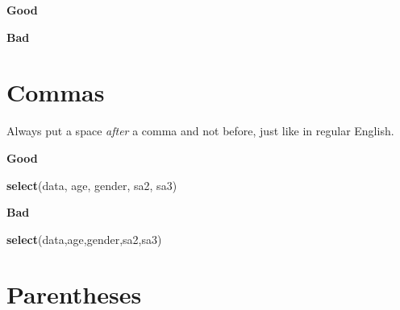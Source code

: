 \documentclass[]{book}
\newenvironment{Shaded}{\begin{snugshade}}{\end{snugshade}}
\newcommand{\DecValTok}[1]{\textcolor[rgb]{0.00,0.00,0.81}{#1}}
\newcommand{\KeywordTok}[1]{\textcolor[rgb]{0.13,0.29,0.53}{\textbf{#1}}}
\newcommand{\NormalTok}[1]{#1}
\newcommand{\OperatorTok}[1]{\textcolor[rgb]{0.81,0.36,0.00}{\textbf{#1}}}
\newcommand{\StringTok}[1]{\textcolor[rgb]{0.31,0.60,0.02}{#1}}
\begin{document}
\textbf{Good}

\begin{Shaded}
\end{Shaded}

\textbf{Bad}

\begin{Shaded}
\end{Shaded}

\hypertarget{commas}{%
\section{Commas}\label{commas}}

Always put a space \emph{after} a comma and not before, just like in regular English.

\textbf{Good}

\begin{Shaded}
\begin{Highlighting}[]
\KeywordTok{select}\NormalTok{(data, age, gender, sa2, sa3)}
\end{Highlighting}
\end{Shaded}

\textbf{Bad}

\begin{Shaded}
\begin{Highlighting}[]
\KeywordTok{select}\NormalTok{(data,age,gender,sa2,sa3)}
\end{Highlighting}
\end{Shaded}

\hypertarget{parentheses}{%
\section{Parentheses}\label{parentheses}}
\end{document}
